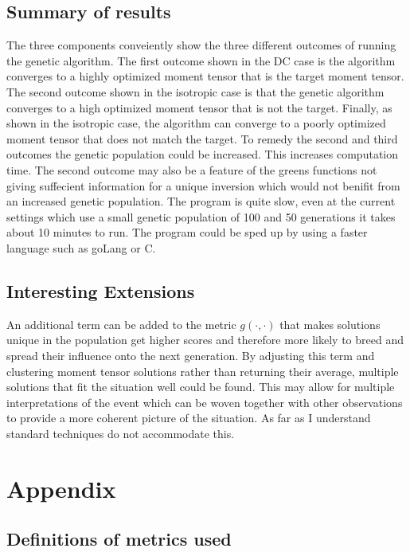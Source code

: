 \documentclass{article}
\begin{document}
\subsection*{Summary of results}
The three components conveiently show the three different outcomes of running the genetic algorithm. The first outcome shown in the DC case 
is the algorithm converges to a highly optimized moment tensor that is the target moment tensor. The second outcome shown in the isotropic case is that the genetic algorithm converges to a high optimized moment tensor that is not the target. Finally, as shown in the isotropic case, the algorithm can converge to a poorly optimized moment tensor that does not match the target.
\newline
To remedy the second and third outcomes the genetic population could be increased. This increases computation time. The second outcome may also be a feature of the greens functions not giving suffecient information for a unique inversion which would not benifit from an increased genetic population.
\newline
The program is quite slow, even at the current settings which use a small genetic population of 100 and 50 generations it takes about 10 minutes to run. The program could be sped up by using a faster language such as goLang or C. 



\subsection*{Interesting Extensions}
An additional term can be added to the metric $g(\cdot, \cdot)$ that makes solutions unique in the population get higher scores and therefore more likely 
to breed and spread their influence onto the next generation. By adjusting this term and clustering moment tensor solutions rather than returning their 
average, multiple solutions that fit the situation well could be found. This may allow for multiple interpretations of the event which can be woven 
together with other observations to provide a more coherent picture of the situation. As far as I understand standard techniques do not accommodate this.


\section*{Appendix}

\subsection*{Definitions of metrics used}
\end{document}
